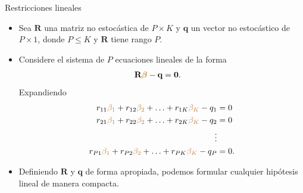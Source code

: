 \documentclass[10pt, xcolor=dvipsnames]{beamer}
\begin{document}
\begin{frame}{Restricciones lineales}
\begin{itemize}
    \item Sea $\textbf{R}$ una matriz no estocástica de $P\times K$ y $\textbf{q}$ un vector no estocástico de $P\times 1$, donde  $P\leq K$ y $\textbf{R}$ tiene rango $P$.
    \medskip
    \item Considere el sistema de $P$ ecuaciones lineales de la forma
    \begin{align*}
        \textbf{R}\textcolor{brown}{\boldsymbol{\beta}} - \textbf{q} &= \mathbf{0}.
    \end{align*}
    \vspace{-1em}
    Expandiendo
    \begin{align*}
    \begin{split}
    r_{11}\textcolor{brown}{\beta_1} + r_{12}\textcolor{brown}{\beta_2} + \ldots + r_{1K}\textcolor{brown}{\beta_K} - q_1 &= 0 \\
    r_{21}\textcolor{brown}{\beta_1} + r_{22}\textcolor{brown}{\beta_2} + \ldots + r_{2K}\textcolor{brown}{\beta_K} - q_2 &= 0 \\
    \vdots \\ 
    r_{P1}\textcolor{brown}{\beta_1} + r_{P2}\textcolor{brown}{\beta_2} + \ldots + r_{PK}\textcolor{brown}{\beta_K} - q_P &= 0. 
    \end{split}
    \end{align*}
    \item Definiendo $\textbf{R}$ y $\textbf{q}$ de forma apropiada, podemos formular cualquier hipótesis lineal de manera compacta. 
\end{itemize}
\end{frame}
\end{document}
